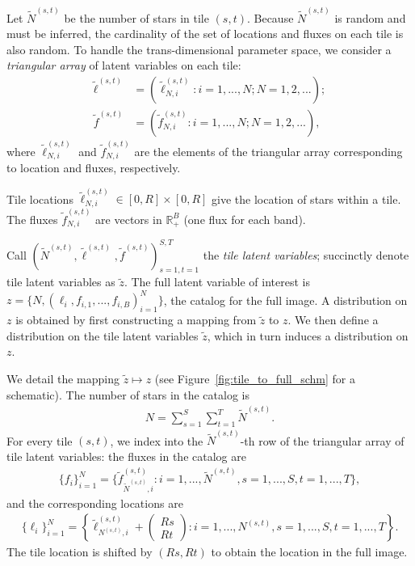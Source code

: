 Let $\tilde N^{(s, t)}$ be the number of stars in tile 
$(s,t)$.
Because $\tilde N^{(s, t)}$ is random and must be inferred, 
the cardinality of the set of locations and fluxes on each tile
is also random. 
To handle the trans-dimensional parameter space, 
we consider a {\itshape triangular array} of latent variables
on each tile:
\begin{align}
    \tilde\ell^{(s, t)} &= (\tilde\ell_{N, i}^{(s, t)} : i = 1, ..., N; N = 1, 2, ...); \\
    \tilde f^{(s, t)} &= (\tilde f_{N, i}^{(s, t)} : i = 1, ..., N; N = 1, 2, ...),
\end{align}
where $\tilde\ell_{N, i}^{(s, t)}$ and $\tilde f_{N, i}^{(s, t)}$ are the elements of the triangular array corresponding to location and fluxes, respectively. 

Tile locations $\tilde\ell_{N, i}^{(s, t)} \in [0, R]\times[0, R]$ give the location of stars within a tile. The fluxes $\tilde f_{N, i}^{(s, t)}$ are vectors in $\mathbb{R}^B_+$ (one flux for each band). 

Call $(\tilde N^{(s, t)}, \tilde \ell^{(s, t)}, \tilde f^{(s, t)})_{s=1,t=1}^{S,T}$ the {\itshape tile latent variables}; 
succinctly denote tile latent variables as $\tilde z$. 
The full latent variable of interest is $z = \{N, (\ell_i, f_{i,1}, ..., f_{i,B})_{i = 1}^N\}$, the catalog for the full image. 
A distribution on $z$ is obtained by first constructing a mapping from $\tilde z$ to $z$.
We then define a distribution 
on the tile latent variables $\tilde z$, which in turn  induces 
a distribution on $z$.  


We detail the mapping $\tilde z\mapsto z$ (see Figure~\ref{fig:tile_to_full_schm} for a schematic).  
The number of stars in the catalog is 
\begin{align}
    N = \sum_{s=1}^{S}\sum_{t=1}^T \tilde N^{(s, t)}. 
\end{align}
For every tile $(s,t)$, we index into the $\tilde N^{(s,t)}$-th
row of the triangular array of tile latent variables:
the fluxes in the catalog are
\begin{align}
    \{f_i\}_{i=1}^N = \Big\{\tilde f_{\tilde N^{(s, t)}, i}^{(s, t)} : i = 1, ..., \tilde N^{(s, t)}, s = 1, ..., S, t = 1, ..., T \Big\},
\end{align}
and the corresponding locations are
\begin{align}
    \{\ell_i\}_{i = 1}^N = \left\{\tilde \ell_{N^{(s, t)}, i}^{(s, t)} + 
    \begin{pmatrix}
    Rs \\ Rt
    \end{pmatrix} 
    : i = 1, ..., N^{(s, t)}, s = 1, ..., S, t = 1, ..., T\right\}. 
\end{align}
The tile location is shifted by $(Rs, Rt)$ to obtain the location in the full image. 

